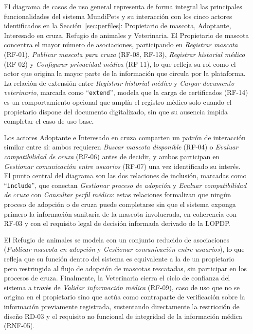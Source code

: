\documentclass[journal,onecolumn]{IEEEtran}
\begin{document}
	El diagrama de casos de uso general representa de forma integral las
	principales funcionalidades del sistema MundiPets y su interacción con los
	cinco actores identificados en la Sección~\ref{sec:perfiles}: Propietario de
	mascota, Adoptante, Interesado en cruza, Refugio de animales y Veterinaria.
	El Propietario de mascota concentra el mayor número de asociaciones,
	participando en \emph{Registrar mascota} (RF-01), \emph{Publicar mascota
		para cruza} (RF-08, RF-13), \emph{Registrar historial médico} (RF-02) y
	\emph{Configurar privacidad médica} (RF-11), lo que refleja su rol como el
	actor que origina la mayor parte de la información que circula por la
	plataforma. La relación de extensión entre \emph{Registrar historial médico}
	y \emph{Cargar documento veterinario}, marcada como
	\enquote{\texttt{extend}}, modela que la carga de certificados (RF-14) es un
	comportamiento opcional que amplía el registro médico solo cuando el
	propietario dispone del documento digitalizado, sin que su ausencia impida
	completar el caso de uso base.
	
	Los actores Adoptante e Interesado en cruza comparten un patrón de
	interacción similar entre sí: ambos requieren \emph{Buscar mascota
		disponible} (RF-04) o \emph{Evaluar compatibilidad de cruza} (RF-06) antes
	de decidir, y ambos participan en \emph{Gestionar comunicación entre
		usuarios} (RF-07) una vez identificado su interés. El punto central del
	diagrama son las dos relaciones de inclusión, marcadas como
	\enquote{\texttt{include}}, que conectan \emph{Gestionar proceso de
		adopción} y \emph{Evaluar compatibilidad de cruza} con \emph{Consultar
		perfil médico}: estas relaciones formalizan que ningún proceso de adopción
	o de cruza puede completarse sin que el sistema exponga primero la
	información sanitaria de la mascota involucrada, en coherencia con RF-03 y
	con el requisito legal de decisión informada derivado de la LOPDP.
	
	El Refugio de animales se modela con un conjunto reducido de asociaciones
	(\emph{Publicar mascota en adopción} y \emph{Gestionar comunicación entre
		usuarios}), lo que refleja que su función dentro del sistema es equivalente
	a la de un propietario pero restringida al flujo de adopción de mascotas
	rescatadas, sin participar en los procesos de cruza. Finalmente, la
	Veterinaria cierra el ciclo de confianza del sistema a través de
	\emph{Validar información médica} (RF-09), caso de uso que no se origina en
	el propietario sino que actúa como contraparte de verificación sobre la
	información previamente registrada, sustentando directamente la restricción
	de diseño RD-03 y el requisito no funcional de integridad de la información
	médica (RNF-05).
	
\end{document}
